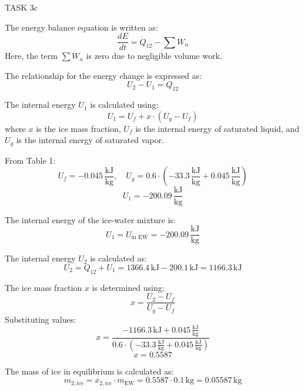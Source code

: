 TASK 3c

The energy balance equation is written as:
\[
\frac{dE}{dt} = \dot{Q}_{12} - \sum \dot{W}_n
\]
Here, the term \( \sum \dot{W}_n \) is zero due to negligible volume work.

The relationship for the energy change is expressed as:
\[
U_2 - U_1 = Q_{12}
\]

The internal energy \( U_1 \) is calculated using:
\[
U_1 = U_f + x \cdot (U_g - U_f)
\]
where \( x \) is the ice mass fraction, \( U_f \) is the internal energy of saturated liquid, and \( U_g \) is the internal energy of saturated vapor.

From Table 1:
\[
U_f = -0.045 \, \frac{\text{kJ}}{\text{kg}}, \quad U_g = 0.6 \cdot (-33.3 \, \frac{\text{kJ}}{\text{kg}} + 0.045 \, \frac{\text{kJ}}{\text{kg}})
\]
\[
U_1 = -200.09 \, \frac{\text{kJ}}{\text{kg}}
\]

The internal energy of the ice-water mixture is:
\[
U_1 = U_{\text{in EW}} = -200.09 \, \frac{\text{kJ}}{\text{kg}}
\]

The internal energy \( U_2 \) is calculated as:
\[
U_2 = Q_{12} + U_1 = 1366.4 \, \text{kJ} - 200.1 \, \text{kJ} = 1166.3 \, \text{kJ}
\]

The ice mass fraction \( x \) is determined using:
\[
x = \frac{U_2 - U_f}{U_g - U_f}
\]
Substituting values:
\[
x = \frac{-1166.3 \, \text{kJ} + 0.045 \, \frac{\text{kJ}}{\text{kg}}}{0.6 \cdot (-33.3 \, \frac{\text{kJ}}{\text{kg}} + 0.045 \, \frac{\text{kJ}}{\text{kg}})}
\]
\[
x = 0.5587
\]

The mass of ice in equilibrium is calculated as:
\[
m_{2,\text{ice}} = x_{2,\text{ice}} \cdot m_{\text{EW}} = 0.5587 \cdot 0.1 \, \text{kg} = 0.05587 \, \text{kg}
\]